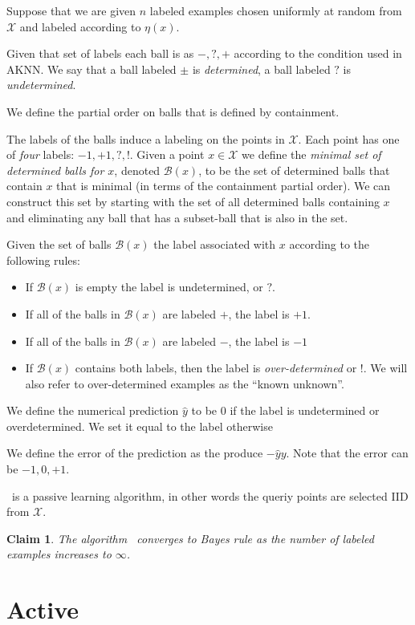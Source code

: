 \documentclass{article}
\def\X{{\mathcal X}}
\def\B{{\mathcal B}}
\newtheorem{claim}[thm]{Claim}
\begin{document}
Suppose that we are given $n$ labeled examples chosen uniformly at
random from $\X$ and labeled according to $\eta(x)$.

Given that set of labels each ball is as $-,?,+$ according to the
condition used in AKNN. We say that a ball labeled $\pm$ is {\em
  determined}, a ball labeled $?$ is {\em undetermined}.

We define the partial order on balls that is defined by containment.

The labels of the balls induce a labeling on the points in $\X$. Each
point has one of {\em four} labels: $-1,+1,?,!$. Given a point $x \in
\X$ we define the {\em minimal set of determined balls for $x$},
denoted $\B(x)$, to be the set of determined balls that contain $x$
that is minimal (in terms of the containment partial order). We can
construct this set by starting with the set of all determined balls containing
$x$ and eliminating any ball that has a subset-ball that is also in
the set.

Given the set of balls $\B(x)$ the label associated with $x$
according to the following rules:
\begin{itemize}
\item If $\B(x)$ is empty the label is undetermined, or $?$.
\item If all of the balls in $\B(x)$ are labeled $+$, the label is $+1$.
\item If all of the balls in $\B(x)$ are labeled $-$, the label is $-1$
\item If $\B(x)$ contains both labels, then the label is {\em
    over-determined} or $!$. We will also refer to over-determined
  examples as the ``known unknown''.
\end{itemize}

We define the numerical prediction $\hat{y}$ to be $0$  if the label
is undetermined or overdetermined. We set it equal to the label otherwise

We define the error of the prediction as the produce
$-\hat{y}{y}$. Note that the error can be $-1,0,+1$. 

\NNB\ is a passive learning algorithm, in other words the queriy
points are selected IID from $\X$.

\begin{claim}
  The algorithm \NNB\ converges to Bayes rule as the number of
  labeled examples increases to $\infty$.
  \end{claim}

\section{Active \NNB}
\end{document}
